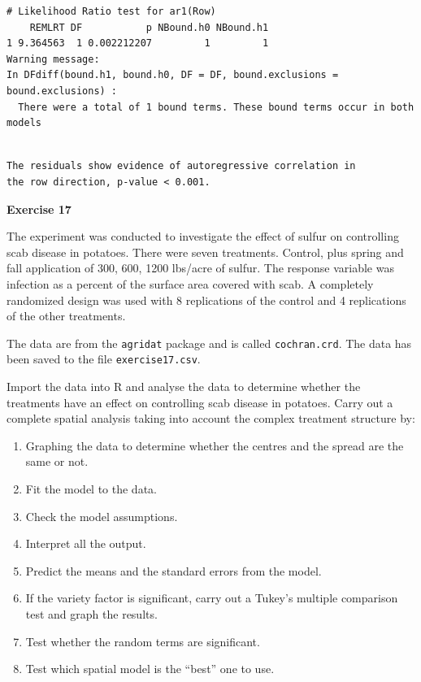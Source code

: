 \documentclass[a4paper, 10pt, fleqn, twosided]{memoir}
\begin{document}
\begin{tcolorbox}[title = Example 7 Likelihood Ratio Test output]
\begin{verbatim}
# Likelihood Ratio test for ar1(Row)
    REMLRT DF           p NBound.h0 NBound.h1
1 9.364563  1 0.002212207         1         1
Warning message:
In DFdiff(bound.h1, bound.h0, DF = DF, bound.exclusions = bound.exclusions) :
  There were a total of 1 bound terms. These bound terms occur in both models
\end{verbatim}
\end{tcolorbox}

\begin{tcolorbox}[title = Example 7 Likelihood Ratio Test Interpretation]
\begin{verbatim}

The residuals show evidence of autoregressive correlation in
the row direction, p-value < 0.001.
\end{verbatim}
\end{tcolorbox}

\textbf{Exercise 17}


The  experiment  was  conducted  to  investigate  the  effect  of  sulfur  on
controlling  scab  disease  in potatoes. There were seven treatments. Control,
plus spring and fall application of 300, 600, 1200 lbs/acre of sulfur. The
response variable was infection as a percent of the surface area covered with
scab. A completely randomized design was used with 8 replications of the
control and 4 replications of the other treatments.


The data are from the \texttt{agridat} package \cite{agridat} and is called
\texttt{cochran.crd}. The data has been saved to the file
\texttt{exercise17.csv}.

Import the data into R and analyse the data to determine whether the treatments
have an effect on controlling  scab  disease  in potatoes. Carry out a complete
spatial analysis taking into account the complex treatment structure by:

\begin{enumerate}
  \item Graphing the data to determine whether the centres and the spread are
      the same or not.
  \item Fit the model to the data.
  \item Check the model assumptions.
  \item Interpret all the output.
  \item Predict the means and the standard errors from the model.
  \item If the variety factor is significant, carry out a Tukey's multiple
      comparison test and graph the results.
  \item Test whether the random terms are significant.
  \item Test which spatial model is the ``best'' one to use.
\end{enumerate}
\end{document}
